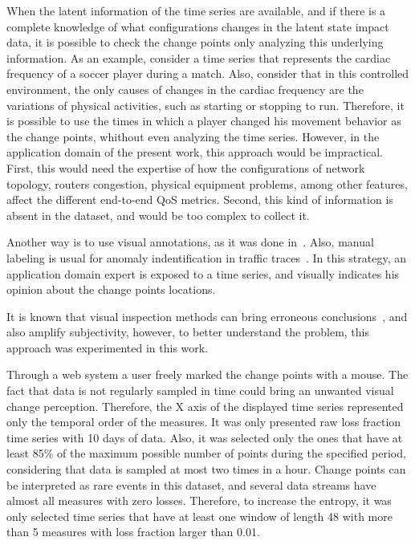 When the latent information of the time series are available, and if there is a
complete knowledge of what configurations changes in the latent state impact
data, it is possible to check the change points only analyzing this underlying
information. As an example, consider a time series that represents the cardiac
frequency of a soccer player during a match. Also, consider that in this
controlled environment, the only causes of changes in the cardiac frequency are
the variations of physical activities, such as starting or stopping to run.
Therefore,
it is possible to use the times in which a player changed his movement behavior
as the change points, whithout even analyzing the time series. However, in the
application domain of the present work, this approach would be impractical.
First, this would need the expertise of how the configurations of network
topology, routers congestion, physical equipment problems, among other features,
affect the different end-to-end QoS metrics.
Second, this kind of information is absent in the dataset, and would be too
complex to collect it.

Another way is to use visual annotations,
as it was done
in~\cite{learning_sparse_penalties_for_change_point_detection_using_max_margin_interval_regression}.
Also, manual labeling is usual for anomaly indentification in traffic
traces~\cite{webclass_adding_rigor_to_manual_labeling_of_traffic_anomalies}.
In this strategy, an application domain expert is exposed to a time series,
and visually indicates his opinion about the change points locations.

It is known that visual inspection methods can bring erroneous
conclusions~\cite{leveraging_cloud_data_to_mitigate_user_experience_from_breaking_bad},
and also amplify subjectivity, however, to better understand the problem, this
approach was experimented in this work.

Through a web system a user freely marked the change points with a mouse.
The fact that data is not regularly sampled in time could bring an unwanted
visual change perception. Therefore, the X axis of the displayed time series
represented only the temporal order of the measures.
It was only presented raw
loss fraction time series with 10 days of data.
Also, it was selected only the ones that have at
least 85\% of the maximum possible number of points during the specified period,
considering that data is sampled at most two times in a hour. Change points can
be interpreted as rare events in this dataset, and several data streams have
almost
all measures with zero losses. Therefore, to increase the entropy,
it was only selected time series that have at least one window of length 48 with
more than 5 measures with loss fraction larger than 0.01.

